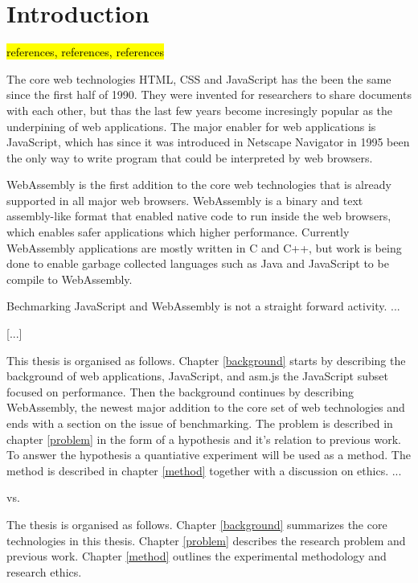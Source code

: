 \section{Introduction}
\label{introduction}

\hl{references, references, references}

The core web technologies HTML, CSS and JavaScript has the been the same since the first half of 1990. They were invented for researchers to share documents with each other, but thas the last few years become incresingly popular as the underpining of web applications. The major enabler for web applications is JavaScript, which has since it was introduced in Netscape Navigator in 1995 been the only way to write program that could be interpreted by web browsers.

WebAssembly is the first addition to the core web technologies that is already supported in all major web browsers. WebAssembly is a binary and text assembly-like format that enabled native code to run inside the web browsers, which enables safer applications which higher performance. Currently WebAssembly applications are mostly written in C and C++, but work is being done to enable garbage collected languages such as Java and JavaScript to be compile to WebAssembly.

Bechmarking JavaScript and WebAssembly is not a straight forward activity. ...

[...]

This thesis is organised as follows. Chapter \ref{background} starts by describing the background of web applications, JavaScript, and asm.js the JavaScript subset focused on performance. Then the background continues by describing WebAssembly, the newest major addition to the core set of web technologies and ends with a section on the issue of benchmarking. The problem is described in chapter \ref{problem} in the form of a hypothesis and it's relation to previous work. To answer the hypothesis a quantiative experiment will be used as a method. The method is described in chapter \ref{method} together with a discussion on ethics. ...

vs.

The thesis is organised as follows. Chapter \ref{background} summarizes the core technologies in this thesis. Chapter \ref{problem} describes the research problem and previous work. Chapter \ref{method} outlines the experimental methodology and research ethics. 
